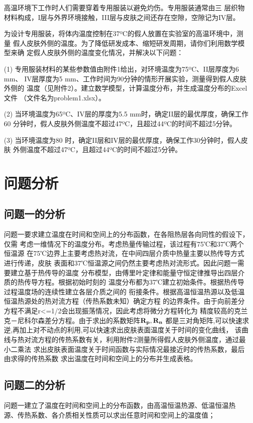 \documentclass{cumcmthesis}
\begin{document}
        高温环境下工作时人们需要穿着专用服装以避免灼伤。专用服装通常由三
    层织物材料构成，I层与外界环境接触，III层与皮肤之间还存在空隙，空隙记为IV层。

        为设计专用服装，将体内温度控制在37ºC的假人放置在实验室的高温环境中，测量
    假人皮肤外侧的温度。为了降低研发成本、缩短研发周期，请你们利用数学模型来确
    定假人皮肤外侧的温度变化情况，并解决以下问题：

        (1) 专用服装材料的某些参数值由附件1给出，对环境温度为75ºC、II层厚度为6 mm、
        IV层厚度为5 mm、工作时间为90分钟的情形开展实验，测量得到假人皮肤外侧的
        温度（见附件2）。建立数学模型，计算温度分布，并生成温度分布的Excel文件
        （文件名为problem1.xlsx）。

        (2) 当环境温度为65ºC、IV层的厚度为5.5 mm时，确定II层的最优厚度，确保工作60
        分钟时，假人皮肤外侧温度不超过47ºC，且超过44ºC的时间不超过5分钟。
    
        (3) 当环境温度为80 时，确定II层和IV层的最优厚度，确保工作30分钟时，假人皮肤
        外侧温度不超过47ºC，且超过44ºC的时间不超过5分钟。
\section{问题分析}
    \subsection{问题一的分析}
    问题一要求建立温度在时间和空间上的分布函数，在各阻热层各向同性的假设下，仅需
    考虑一维情况下的温度分布。考虑热量传输过程，该过程有75℃和37℃两个恒温源
    在75℃边界上主要考虑热对流，在中间四层介质中热量主要以热传导方式进行传递，皮肤
    表面和37℃恒温源之间仍然主要考虑热对流形式。因此问题一需要建立基于热传导的温度
    分布模型，由傅里叶定律和能量守恒定律推导出四层介质的热传导方程。根据初始时刻的
    温度分布都为37℃建立初始条件。根据热传导过程温度场的连续性建立各层介质之间的
    衔接条件。根据高温恒温热源以及低温恒温热源处的热对流方程（传热系数未知）确定方程
    的边界条件。由于向前差分方程不满足r<=1/2会出现振荡情况，因此考虑将微分方程转化为
    精度较高的克兰克－尼科尔森差分方程\cite{1}。由于求出的系数矩阵\(\bf{R_p},\bf{R_n}\)
    都是三对角矩阵,可以快速求逆,再加上对不动点的利用,可以快速求出皮肤表面温度关于时间的变化曲线，
    该曲线与热对流方程的传热系数有关，利用附件2测量所得假人皮肤外侧温度，通过最小二乘法
    求出皮肤表面温度关于时间函数与实际情况最接近时的传热系数，最后由求得的传热系数
    求出温度在时间和空间上的分布并生成表格。

    \subsection{问题二的分析}
    问题一建立了温度在时间和空间上的分布函数，由高温恒温热源、低温恒温热
    源、传热系数、各介质相关性质可以求出任意时间和空间上的温度值；
\end{document}
